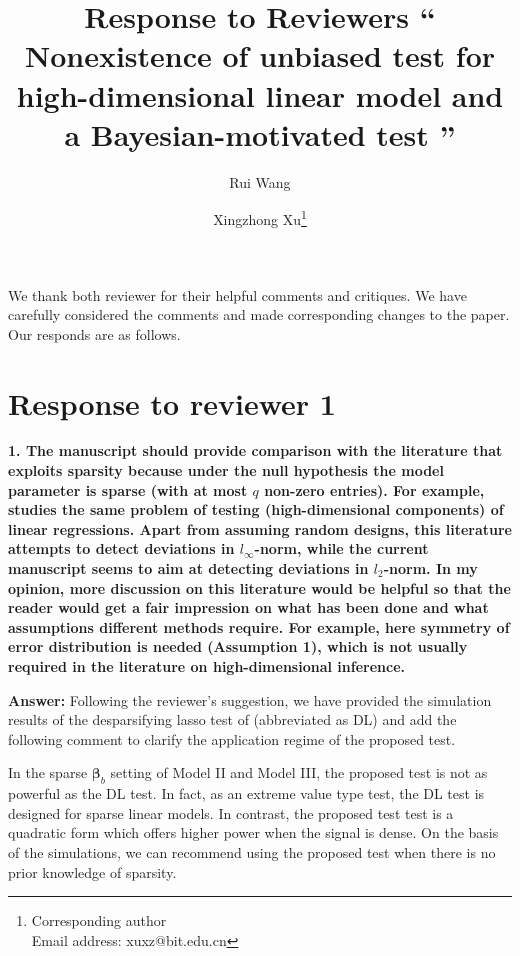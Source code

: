 \documentclass[11pt]{article}
\newcommand{\bfsym}[1]{\ensuremath{\boldsymbol{#1}}}
\def\bbeta{\bfsym \beta}
\theoremstyle{plain}
\theoremstyle{definition}
\theoremstyle{remark}
\begin{document}
\title{
Response to Reviewers
``
Nonexistence of unbiased test for high-dimensional linear model and a Bayesian-motivated test 
''
}



\author[1]{Rui Wang}
\author[1,2]{Xingzhong Xu\thanks{Corresponding author\\Email address: xuxz@bit.edu.cn}}

\maketitle

We thank both reviewer for their helpful comments and critiques.
We have carefully considered the comments and made corresponding changes to the paper.
Our responds are as follows.

\section{Response to reviewer 1}

\textbf{
    1.
    The manuscript should provide comparison with the literature that exploits sparsity because under the null hypothesis the model parameter is sparse (with at most $q$ non-zero entries).
    For example, \cite{zhang2016simultaneous} studies the same problem of testing (high-dimensional components) of linear regressions. Apart from assuming random designs, this literature attempts to detect deviations in $l_\infty$-norm, while the current manuscript seems to aim at detecting deviations in $l_2$-norm.
    In my opinion, more discussion on this literature would be helpful so that the reader would get a fair impression on what has been done and what assumptions different methods require.
    For example, here symmetry of error distribution is needed (Assumption 1), which is not usually required in the literature on high-dimensional inference.
}

\textbf{Answer:}
Following the reviewer's suggestion, we have provided the simulation results of the desparsifying lasso test of \cite{zhang2016simultaneous} (abbreviated as DL) and add the following comment to clarify the application regime of the proposed test.

\begin{adjustwidth}{3em}{3em}
In the sparse $\bbeta_b$ setting of
Model II and Model III, the proposed test is not as powerful as the DL test.
In fact, as an extreme value type test, the DL test is designed for sparse linear
models.
In contrast, the proposed test test is a quadratic form which offers
higher power when the signal is dense.
On the basis of the simulations, we can recommend using the proposed
test when there is no prior knowledge of sparsity.
\end{adjustwidth}
\end{document}
